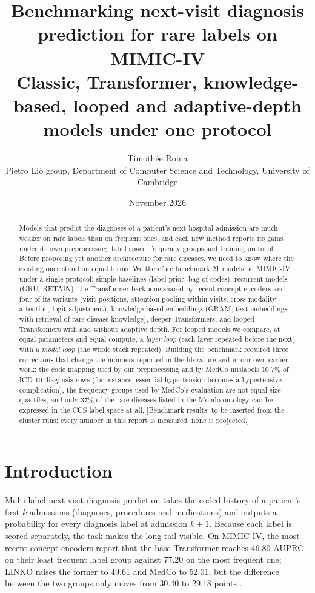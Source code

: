 \documentclass[11pt]{article}
\title{\textbf{Benchmarking next-visit diagnosis prediction for rare labels on MIMIC-IV}\\[4pt]
\large Classic, Transformer, knowledge-based, looped and adaptive-depth models under one protocol}
\author{Timoth\'ee Roina\\
\small Pietro Li\`o group, Department of Computer Science and Technology, University of Cambridge}
\date{November 2026}
\begin{document}
\maketitle

\begin{abstract}
Models that predict the diagnoses of a patient's next hospital admission are much weaker on rare labels than on
frequent ones, and each new method reports its gains under its own preprocessing, label space, frequency groups
and training protocol. Before proposing yet another architecture for rare diseases, we need to know where the
existing ones stand on equal terms. We therefore benchmark 21 models on MIMIC-IV under a single protocol: simple
baselines (label prior, bag of codes), recurrent models (GRU, RETAIN), the Transformer backbone shared by recent
concept encoders and four of its variants (visit positions, attention pooling within visits, cross-modality
attention, logit adjustment), knowledge-based embeddings (GRAM; text embeddings with retrieval of rare-disease
knowledge), deeper Transformers, and looped Transformers with and without adaptive depth. For looped models we
compare, at equal parameters and equal compute, a \emph{layer loop} (each layer repeated before the next) with a
\emph{model loop} (the whole stack repeated). Building the benchmark required three corrections that change the
numbers reported in the literature and in our own earlier work: the code mapping used by our preprocessing and by
MedCo mislabels 10.7\% of ICD-10 diagnosis rows (for instance, essential hypertension becomes a hypertensive
complication), the frequency groups used by MedCo's evaluation are not equal-size quartiles, and only 37\% of the
rare diseases listed in the Mondo ontology can be expressed in the CCS label space at all. [Benchmark results:
to be inserted from the cluster runs; every number in this report is measured, none is projected.]
\end{abstract}

\section{Introduction}

Multi-label next-visit diagnosis prediction takes the coded history of a patient's first $k$ admissions
(diagnoses, procedures and medications) and outputs a probability for every diagnosis label at admission $k+1$.
Because each label is scored separately, the task makes the long tail visible. On MIMIC-IV, the most recent concept
encoders report that the base Transformer reaches 46.80 AUPRC on their least frequent label group against 77.20 on
the most frequent one; LINKO \citep{linko2025} raises the former to 49.61 and MedCo \citep{medco2026} to 52.01, but
the difference between the two groups only moves from 30.40 to 29.18 points \citep[Table 1]{medco2026}.
\end{document}
